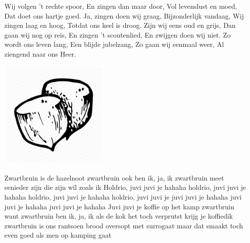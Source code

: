 \documentclass{article}
\begin{document}
\begin{songs}{}
\beginverse*
Wij volgen 't rechte spoor,
En zingen dan maar door,
Vol levenslust en moed,
Dat doet ons hartje goed.
\endverse
\beginverse*
Ja, zingen doen wij graag,
Bijzonderlijk vandaag,
Wij zingen laag en hoog,
Totdat ons keel is droog.
\endverse
\beginverse*
Zijn wij eens oud en grijs,
Dan gaan wij nog op reis,
En zingen 't scoutenlied,
En zwijgen doen wij niet.
\endverse
\beginverse*
Zo wordt ons leven lang,
Een blijde jubelzang,
Zo gaan wij eenmaal weer,
Al ziengend naar ons Heer.
\endverse
\endsong
\begin{intersong}
    \includegraphics[width=0.4\textwidth]{zwartbruinisdehazelnoot}
\end{intersong}
\beginverse*
Zwartbruin is de hazelnoot
zwartbruin ook ben ik, ja, ik
zwartbruin meet eenieder zijn
die zijn wil zoals ik
\endverse
\beginchorus
Holdrio, juvi juvi je hahaha
holdrio, juvi juvi je hahaha
holdrio, juvi juvi je hahaha
holdrio, juvi juvi je
juvi juvi je hahaha
juvi juvi je hahaha
juvi juvi je hahaha
Juvi juvi je
\endchorus
\beginverse*
koffie op het kamp zwartbruin
want zwartbruin ben ik, ja, ik
als de kok het toch verprutst
krijg je koffiedik
\endverse
\beginverse*
zwartbruin is ons rantsoen brood
oversopt met surrogaat
maar dat smaakt toch even goed
als men op kamping gaat
\endverse
\endsong




\end{songs}

\end{document}

